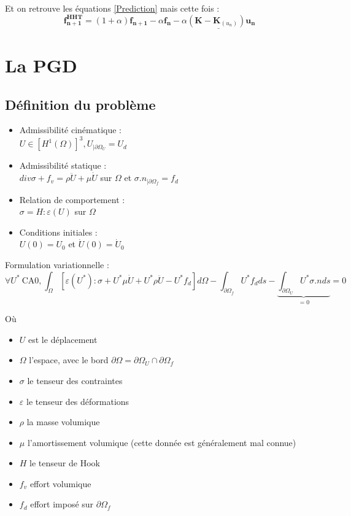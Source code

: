 \documentclass[12pt,a4paper]{report}
\begin{document}
\noindent
Et on retrouve les équations \ref{Prediction} mais cette fois :
\begin{equation}
		\mathbf{f_{n+1}^{H\!H\!T}} = (1+\alpha)\mathbf{f_{n+1}}  
		- \alpha \mathbf{f_n} - \underline{ \alpha (\mathbf{K}-\mathbf{K}_{(u_{n})} ) \mathbf{u_n}}
\end{equation}

\section{La PGD} 


\subsection{Définition du problème}

\begin{itemize}
\item Admissibilité cinématique :
	\\$U \in [H^1(\Omega)]^3, U_{|\partial \Omega_U} = U_d $
\item Admissibilité statique :
	\\$ div \sigma + f_v = \rho \ddot{U} + \mu \dot{U}$ sur $\Omega$ 
		et $\sigma . n _{|\partial \Omega_f} = f_d$
\item Relation de comportement :
	\\$\sigma = H : \varepsilon (U)$ sur $ \Omega$
\item Conditions initiales :
	\\$U(0) = U_0$ et $ \dot{U}(0) = \dot{U}_0$
\end{itemize}

\noindent
Formulation variationnelle : 
\begin{equation}
	\forall U^* ~ \text{CA0,} ~
		\int_\Omega [\varepsilon (U^*) : \sigma   
					+ U^* \mu \dot{U} 
					+ U^* \rho \ddot{U}
					- U^* f_d
					] d \Omega	
		- \int_{\partial \Omega_f} U^* f_d  ds		
		- \underbrace{
			\int_{\partial \Omega_U} U^* \sigma . n ds	
		  }_{=0}
		= 0
\end{equation}

\noindent
Où
\begin{itemize}
\item $U$ est le déplacement
\item $\Omega$ l'espace, avec le bord $\partial \Omega = \partial \Omega_U \cap \partial \Omega_f$
\item $\sigma$ le tenseur des contraintes
\item $\varepsilon$ le tenseur des déformations
\item $\rho$ la masse volumique
\item $\mu$ l'amortissement volumique (cette donnée est généralement mal connue)
\item $H$ le tenseur de Hook
\item $f_v$ effort volumique
\item $f_d$ effort imposé sur $\partial \Omega_f$
\end{itemize}
\vspace{0.3cm}
\end{document}
